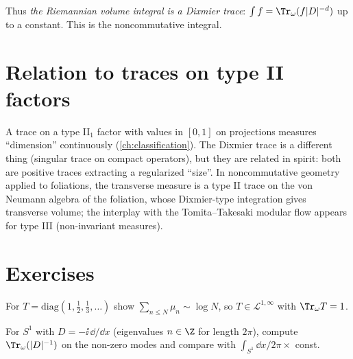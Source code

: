Thus \emph{the Riemannian volume integral is a Dixmier trace}: $\int f=\Tr_\omega(f|D|^{-d})$ up to a constant. This is the noncommutative integral.

\section{Relation to traces on type II factors}

A trace on a type II$_1$ factor with values in $[0,1]$ on projections measures ``dimension'' continuously (\cref{ch:classification}). The Dixmier trace is a different thing (singular trace on compact operators), but they are related in spirit: both are positive traces extracting a regularized ``size''. In noncommutative geometry applied to foliations, the transverse measure is a type II trace on the von Neumann algebra of the foliation, whose Dixmier-type integration gives transverse volume; the interplay with the Tomita--Takesaki modular flow appears for type III (non-invariant measures).

\section*{Exercises}
\begin{exercise}
For $T=\mathrm{diag}(1,\tfrac12,\tfrac13,\dots)$ show $\sum_{n\le N}\mu_n\sim\log N$, so $T\in\mathcal L^{1,\infty}$ with $\Tr_\omega T=1$.
\end{exercise}
\begin{exercise}
For $S^1$ with $D=-\ii\,\dd/\dd x$ (eigenvalues $n\in\Z$ for length $2\pi$), compute $\Tr_\omega(|D|^{-1})$ on the non-zero modes and compare with $\int_{S^1}\dd x/2\pi\times$ const.
\end{exercise}
